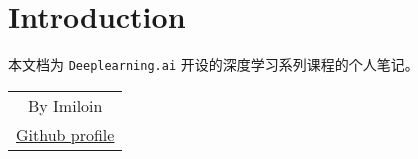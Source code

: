 \chapter*{Introduction}
	本文档为 \nolinkurl{Deeplearning.ai} 开设的深度学习系列课程的个人笔记。

	\vspace{1em}
	\begin{flushright}\begin{minipage}{0.2 \textwidth}
		\begin{tabular}{c}
			{By Imiloin} \\
			\href{https://github.com/Imiloin}{Github profile}\\
		\end{tabular}
	\end{minipage}\end{flushright}